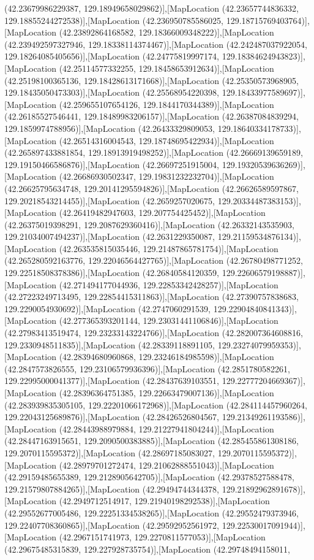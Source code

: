 (42.23679986229387, 129.18949658029862)],[MapLocation (42.23657744836332, 129.18855244272538)],[MapLocation (42.236950785586025, 129.18715769403764)],[MapLocation (42.23892864168582, 129.18366009348222)],[MapLocation (42.239492597327946, 129.18338114374467)],[MapLocation (42.242487037922054, 129.18264085405656)],[MapLocation (42.24775819997174, 129.18384624943823)],[MapLocation (42.25114577332255, 129.18458653912634)],[MapLocation (42.25198100365136, 129.18428613171668)],[MapLocation (42.25350573968905, 129.18435050473303)],[MapLocation (42.25568954220398, 129.18433977589697)],[MapLocation (42.259655107654126, 129.1844170344389)],[MapLocation (42.26185527546441, 129.18489983206157)],[MapLocation (42.26387084839294, 129.1859974788956)],[MapLocation (42.26433329809053, 129.18640334178733)],[MapLocation (42.26514316004543, 129.18748695422934)],[MapLocation (42.265897433881854, 129.18913919498252)],[MapLocation (42.26669139659189, 129.19150466586876)],[MapLocation (42.26697251915004, 129.19320539636269)],[MapLocation (42.26686930502347, 129.19831232232704)],[MapLocation (42.26625795634748, 129.20141295594826)],[MapLocation (42.26626589597867, 129.20218543214455)],[MapLocation (42.2659257020675, 129.20334487383153)],[MapLocation (42.26419482947603, 129.207754425452)],[MapLocation (42.26375019398291, 129.2087629360416)],[MapLocation (42.26332143535903, 129.21034007494237)],[MapLocation (42.2631229350087, 129.21159534876134)],[MapLocation (42.263535815035446, 129.21487865781754)],[MapLocation (42.265280592163776, 129.22046564427765)],[MapLocation (42.26780498771252, 129.22518508378386)],[MapLocation (42.26840584120359, 129.22606579198887)],[MapLocation (42.271494177044936, 129.22853342428257)],[MapLocation (42.27223249713495, 129.22854415311863)],[MapLocation (42.27390757838683, 129.2290054930692)],[MapLocation (42.2747060291539, 129.22904840841343)],[MapLocation (42.277365393201144, 129.23031441106846)],[MapLocation (42.27983413519474, 129.23233143224766)],[MapLocation (42.282007364608816, 129.2330948511835)],[MapLocation (42.28339118891105, 129.23274079959353)],[MapLocation (42.28394680960868, 129.23246184985598)],[MapLocation (42.2847573826555, 129.23106579936396)],[MapLocation (42.2851780582261, 129.22995000041377)],[MapLocation (42.28437639103551, 129.22777204669367)],[MapLocation (42.28396364751385, 129.22663479007136)],[MapLocation (42.283939835305105, 129.22201066172968)],[MapLocation (42.284114457960264, 129.22043125689876)],[MapLocation (42.28426526804567, 129.21349261193586)],[MapLocation (42.28443988979884, 129.21227941804244)],[MapLocation (42.28447163915651, 129.2090500383885)],[MapLocation (42.285455861308186, 129.2070115595372)],[MapLocation (42.28697185083027, 129.2070115595372)],[MapLocation (42.28979701272474, 129.21062888551043)],[MapLocation (42.29159485655389, 129.2128905642705)],[MapLocation (42.29378527588478, 129.21579807884265)],[MapLocation (42.29494744344378, 129.21892962891678)],[MapLocation (42.2949712514917, 129.21940198292538)],[MapLocation (42.29552677005486, 129.22251334538265)],[MapLocation (42.29552479373946, 129.22407708360865)],[MapLocation (42.29592952561972, 129.22530017091944)],[MapLocation (42.2967151741973, 129.2270811577053)],[MapLocation (42.29675485315839, 129.227928735754)],[MapLocation (42.29748494158011, 
